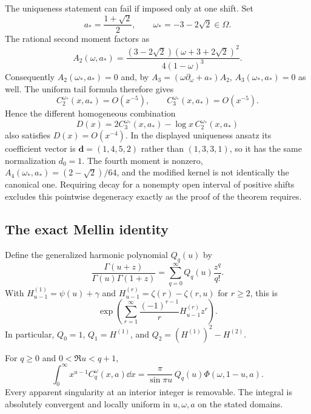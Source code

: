 \begin{remark}
\label{col:pointwise-counterexample}
The uniqueness statement can fail if imposed only at one shift.
Set
\[
 a_* = \frac{1+\sqrt2}{2},\qquad
 \omega_*=-3-2\sqrt2\in\Omega.
\]
The rational second moment factors as
\[
 A_2(\omega,a_*)
  =\frac{(3-2\sqrt2)(\omega+3+2\sqrt2)^2}
          {4(1-\omega)^3}.
\]
Consequently $A_2(\omega_*,a_*)=0$ and, by
$A_3=(\omega\partial_\omega+a_*)A_2$,
$A_3(\omega_*,a_*)=0$ as well.
The uniform tail formula therefore gives
\[
 C_2^{\omega_*}(x,a_*)=O(x^{-5}),\qquad
 C_3^{\omega_*}(x,a_*)=O(x^{-5}).
\]
Hence the different homogeneous combination
\[
 D(x)=2C_3^{\omega_*}(x,a_*)
                  -\log x\,C_2^{\omega_*}(x,a_*)
\]
also satisfies $D(x)=O(x^{-4})$.  In the displayed uniqueness
ansatz its coefficient vector is
$\boldsymbol d=(1,4,5,2)$ rather than $(1,3,3,1)$, so it has
the same normalization $d_0=1$.  The fourth moment is nonzero,
$A_4(\omega_*,a_*)=(2-\sqrt2)/64$, and the modified kernel is
not identically the canonical one.  Requiring decay for a
nonempty open interval of positive shifts excludes this
pointwise degeneracy exactly as the proof of the theorem requires.
\end{remark}

\subsection{The exact Mellin identity}

Define the generalized harmonic polynomial $Q_q(u)$ by
\begin{equation}\label{col:Q}
 \frac{\Gamma(u+z)}{\Gamma(u)\Gamma(1+z)}
     =\sum_{q=0}^\infty Q_q(u)\frac{z^q}{q!}.
\end{equation}
With
$H_{u-1}^{(1)}=\psi(u)+\gamma$ and
$H_{u-1}^{(r)}=\zeta(r)-\zeta(r,u)$ for $r\ge2$, this is
\[
 \exp\!\left(\sum_{r=1}^\infty
          \frac{(-1)^{r-1}}r H_{u-1}^{(r)}z^r\right).
\]
In particular,
$Q_0=1$, $Q_1=H^{(1)}$, and
$Q_2=(H^{(1)})^2-H^{(2)}$.

\begin{theorem}\label{col:mellin}
For $q\ge0$ and $0<\Re u<q+1$,
\begin{equation}\label{col:mellin-formula}
 \boxed{\displaystyle
 \int_0^\infty x^{u-1}C_q^\omega(x,a)\dd x
  =\frac{\pi}{\sin\pi u}\,Q_q(u)\Phi(\omega,1-u,a).}
\end{equation}
Every apparent singularity at an interior integer is removable.
The integral is absolutely convergent and locally uniform in
$u,\omega,a$ on the stated domains.
\end{theorem}

